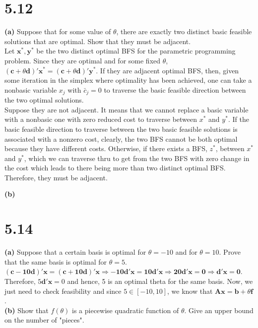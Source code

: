 \documentclass{article}
\begin{document}
\section*{5.12}
\textbf{(a)}  Suppose that for some value of $\theta$, there are exactly two distinct basic feasible solutions that are optimal.  Show that they must be adjacent.  \\

\noindent
Let $ \mathbf{x^*, y^*}$ be the two distinct optimal BFS for the parametric programming problem.  Since they are optimal and for some fixed $\theta$, $(\mathbf{c} + \theta \mathbf{d})\mathbf{' x^*} = (\mathbf{c} + \theta \mathbf{d})\mathbf{' y^*}$.  If they are adjacent optimal BFS, then, given some iteration in the simplex where optimality has been achieved, one can take a nonbasic variable $x_j$ with $\bar{c}_j = 0$ to traverse the basic feasible direction between the two optimal solutions.  \\

\noindent
Suppose they are not adjacent.  It means that we cannot replace a basic variable with a nonbasic one with zero reduced cost to traverse between $x^*$ and $y^*$.  If the basic feasible direction to traverse between the two basic feasible solutions is associated with a nonzero cost, clearly, the two BFS cannot be both optimal because they have different costs.  Otherwise,  if there exists a BFS, $z^*$, between $x^*$ and $y^*$, which we can traverse thru to get from the two BFS with zero change in the cost which leads to there being more than two distinct optimal BFS.  Therefore, they must be adjacent.

\textbf{(b)}

\section*{5.14}
\textbf{(a)} Suppose that a certain basis is optimal for $\theta = -10$ and for $\theta = 10$.  Prove that the same basis is optimal for $\theta = 5$.  \\

\noindent
$\mathbf{(c - 10d)' x = (c + 10d)' x \Rightarrow -10d'x = 10d'x \Rightarrow 20d'x = 0 \Rightarrow d'x = 0}$.  Therefore, $5 \mathbf{d'x} = 0$ and hence, 5 is an optimal theta for the same basis.  Now, we just need to check feasibility and since $5 \in [-10, 10]$, we know that $\mathbf{Ax = b} + \theta \mathbf{f}$. \\

\noindent
\textbf{(b)}  Show that $f(\theta)$ is a piecewise quadratic function of $\theta$.  Give an upper bound on the number of "pieces". \\
\end{document}
